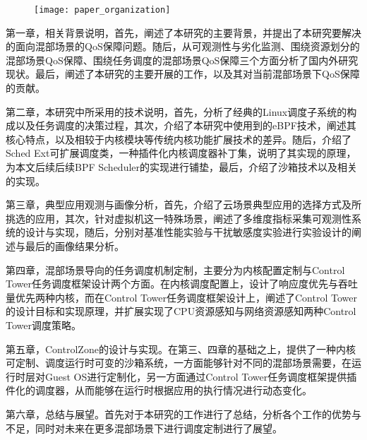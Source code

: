 \begin{figure}[!htbp]
    \centering
    \texttt{[image: paper\_organization]}
    \label{fig:paper_organization}
\end{figure}

第一章，相关背景说明，首先，阐述了本研究的主要背景，并提出了本研究要解决的面向混部场景的QoS保障问题。随后，从可观测性与劣化监测、围绕资源划分的混部场景QoS保障、围绕任务调度的混部场景QoS保障三个方面分析了国内外研究现状。最后，阐述了本研究的主要开展的工作，以及其对当前混部场景下QoS保障的贡献。

第二章，本研究中所采用的技术说明，首先，分析了经典的Linux调度子系统的构成以及任务调度的决策过程，其次，介绍了本研究中使用到的eBPF技术，阐述其核心特点，以及相较于内核模块等传统内核功能扩展技术的差异。随后，介绍了Sched Ext可扩展调度类，一种插件化内核调度器补丁集，说明了其实现的原理，为本文后续后续BPF Scheduler的实现进行铺垫，最后，介绍了沙箱技术以及相关的实现。

第三章，典型应用观测与画像分析，首先，介绍了云场景典型应用的选择方式及所挑选的应用，其次，针对虚拟机这一特殊场景，阐述了多维度指标采集可观测性系统的设计与实现，随后，分别对基准性能实验与干扰敏感度实验进行实验设计的阐述与最后的画像结果分析。

第四章，混部场景导向的任务调度机制定制，主要分为内核配置定制与Control Tower任务调度框架设计两个方面。在内核调度配置上，设计了响应度优先与吞吐量优先两种内核，而在Control Tower任务调度框架设计上，阐述了Control Tower的设计目标和实现原理，并扩展实现了CPU资源感知与网络资源感知两种Control Tower调度策略。

第五章，ControlZone的设计与实现。在第三、四章的基础之上，提供了一种内核可定制、调度运行时可变的沙箱系统，一方面能够针对不同的混部场景需要，在运行时层对Guest OS进行定制化，另一方面通过Control Tower任务调度框架提供插件化的调度器，从而能够在运行时根据应用的执行情况进行动态变化。

第六章，总结与展望。首先对于本研究的工作进行了总结，分析各个工作的优势与不足，同时对未来在更多混部场景下进行调度定制进行了展望。